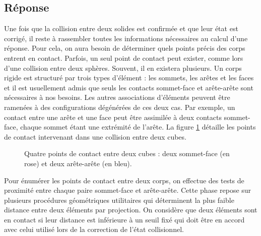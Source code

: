 \subsection{Réponse}

Une fois que la collision entre deux solides est confirmée et que leur
état est corrigé, il reste à rassembler toutes les informations
nécessaires au calcul d'une réponse. Pour cela, on aura besoin de
déterminer quels points précis des corps entrent en contact.  Parfois,
un seul point de contact peut exister, comme lors d'une collision
entre deux sphères. Souvent, il en existera plusieurs. Un corps rigide
est structuré par trois types d'élément : les sommets, les arêtes et
les faces et il est usuellement admis que seuls les contacts
sommet-face et arête-arête sont nécessaires à nos besoins. Les autres
associations d'éléments peuvent être ramenées à des configurations
dégénérées de ces deux cas. Par exemple, un contact entre une arête et
une face peut être assimilée à deux contacts sommet-face, chaque
sommet étant une extrémité de l'arête. La figure \ref{contacts}
détaille les points de contact intervenant dans une collision entre
deux cubes.

\begin{figure}
  \centering
  \subfloat{
    
    
  }
  \caption{Quatre points de contact entre deux cubes : deux
    sommet-face (en rose) et deux arête-arête (en bleu).}
  \label{contacts}
\end{figure}

Pour énumérer les points de contact entre deux corps, on effectue des
tests de proximité entre chaque paire sommet-face et
arête-arête. Cette phase repose sur plusieurs procédures géométriques
utilitaires qui déterminent la plus faible distance entre deux
éléments par projection. On considère que deux éléments sont en
contact si leur distance est inférieure à un seuil fixé qui doit être
en accord avec celui utilisé lors de la correction de l'état
collisionnel.

